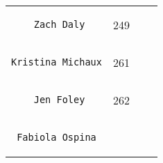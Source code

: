 \documentclass[]{article}
\begin{document}
\begin{longtable}[c]{@{}llll@{}}
\begin{minipage}[t]{0.39\columnwidth}
\begin{verbatim}
    Zach Daly
\end{verbatim}
\end{minipage} & \begin{minipage}[t]{0.10\columnwidth}\raggedright
249
\end{minipage} & \begin{minipage}[t]{0.13\columnwidth}\raggedright
\end{minipage} & \begin{minipage}[t]{0.15\columnwidth}\raggedright
\end{minipage}
\\\noalign{\medskip}
\begin{minipage}[t]{0.39\columnwidth}\raggedright
\begin{verbatim}
Kristina Michaux
\end{verbatim}
\end{minipage} & \begin{minipage}[t]{0.10\columnwidth}\raggedright
261
\end{minipage} & \begin{minipage}[t]{0.13\columnwidth}\raggedright
\end{minipage} & \begin{minipage}[t]{0.15\columnwidth}\raggedright
\end{minipage}
\\\noalign{\medskip}
\begin{minipage}[t]{0.39\columnwidth}\raggedright
\begin{verbatim}
    Jen Foley
\end{verbatim}
\end{minipage} & \begin{minipage}[t]{0.10\columnwidth}\raggedright
262
\end{minipage} & \begin{minipage}[t]{0.13\columnwidth}\raggedright
\end{minipage} & \begin{minipage}[t]{0.15\columnwidth}\raggedright
\end{minipage}
\\\noalign{\medskip}
\begin{minipage}[t]{0.39\columnwidth}\raggedright
\begin{verbatim}
 Fabiola Ospina
\end{verbatim}
\end{minipage} & \begin{minipage}[t]{0.10\columnwidth}\raggedright

\end{minipage}
\end{longtable}
\end{document}

